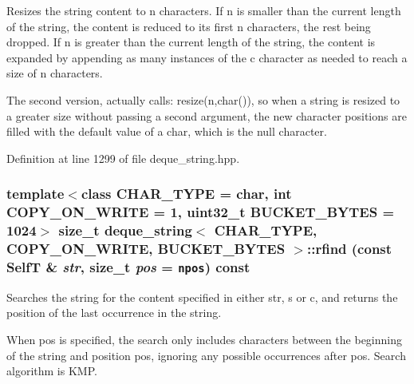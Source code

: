 Resizes the string content to n characters. If n is smaller than the current length of the string, the content is reduced to its first n characters, the rest being dropped. If n is greater than the current length of the string, the content is expanded by appending as many instances of the c character as needed to reach a size of n characters.

The second version, actually calls: resize(n,char()), so when a string is resized to a greater size without passing a second argument, the new character positions are filled with the default value of a char, which is the null character. 

Definition at line 1299 of file deque\_\-string.hpp.\hypertarget{classdeque__string_c15ec121d4678cfa6cb4dd69b0b8bc16}{
\subsubsection[{rfind}]{\setlength{\rightskip}{0pt plus 5cm}template$<$class CHAR\_\-TYPE  = char, int COPY\_\-ON\_\-WRITE = 1, uint32\_\-t BUCKET\_\-BYTES = 1024$>$ size\_\-t {\bf deque\_\-string}$<$ CHAR\_\-TYPE, COPY\_\-ON\_\-WRITE, BUCKET\_\-BYTES $>$::rfind (const {\bf SelfT} \& {\em str}, \/  size\_\-t {\em pos} = {\tt {\bf npos}}) const}}
\label{classdeque__string_c15ec121d4678cfa6cb4dd69b0b8bc16}


Searches the string for the content specified in either str, s or c, and returns the position of the last occurrence in the string.

When pos is specified, the search only includes characters between the beginning of the string and position pos, ignoring any possible occurrences after pos. Search algorithm is KMP.

